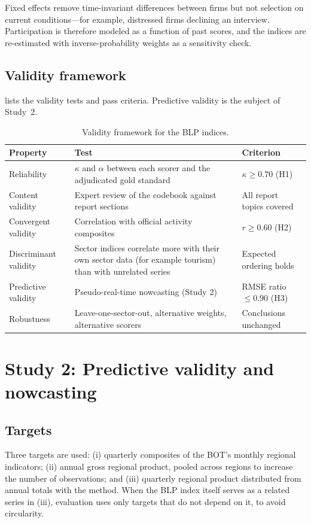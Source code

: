\documentclass[11pt]{article}
\begin{document}
Fixed effects remove time-invariant differences between firms but not selection on current conditions---for example, distressed firms declining an interview. Participation is therefore modeled as a function of past scores, and the indices are re-estimated with inverse-probability weights as a sensitivity check.

\subsection{Validity framework}
 lists the validity tests and pass criteria. Predictive validity is the subject of Study~2.

\begin{table}[tbp]
\centering\small
\caption{Validity framework for the BLP indices.}\label{tab:validity}
\begin{tabularx}{\textwidth}{@{}L{3.1cm}YL{3.6cm}@{}}
\toprule
Property & Test & Criterion \\
\midrule
Reliability & $\kappa$ and $\alpha$ between each scorer and the adjudicated gold standard & $\kappa \geq 0.70$ (H1) \\
Content validity & Expert review of the codebook against report sections & All report topics covered \\
Convergent validity & Correlation with official activity composites & $r \geq 0.60$ (H2) \\
Discriminant validity & Sector indices correlate more with their own sector data (for example tourism) than with unrelated series & Expected ordering holds \\
Predictive validity & Pseudo-real-time nowcasting (Study 2) & RMSE ratio $\leq 0.90$ (H3) \\
Robustness & Leave-one-sector-out, alternative weights, alternative scorers & Conclusions unchanged \\
\bottomrule
\end{tabularx}
\end{table}

\section{Study 2: Predictive validity and nowcasting}\label{sec:study2}

\subsection{Targets}
Three targets are used: (i) quarterly composites of the BOT's monthly regional indicators; (ii) annual gross regional product, pooled across regions to increase the number of observations; and (iii) quarterly regional product distributed from annual totals with the \citet{chow1971best} method. When the BLP index itself serves as a related series in (iii), evaluation uses only targets that do not depend on it, to avoid circularity.
\end{document}
